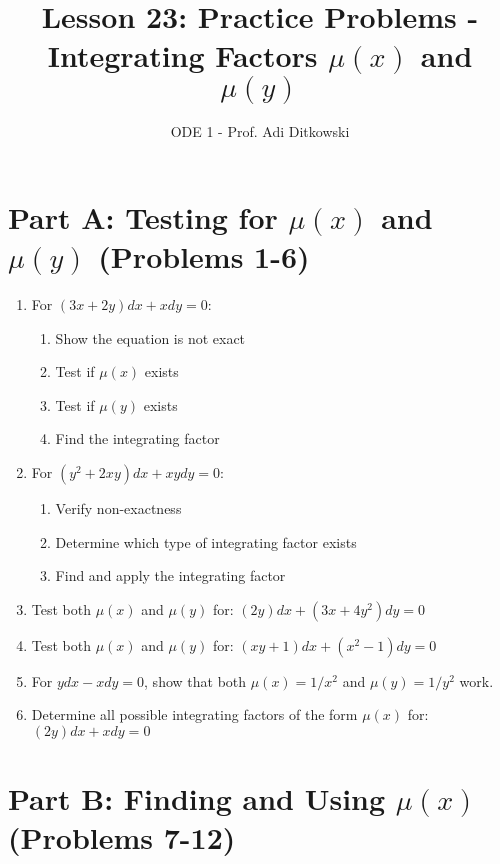 \documentclass[12pt]{article}
\title{Lesson 23: Practice Problems - Integrating Factors $\mu(x)$ and $\mu(y)$}
\author{ODE 1 - Prof. Adi Ditkowski}
\date{}
\begin{document}
\maketitle

\section*{Part A: Testing for $\mu(x)$ and $\mu(y)$ (Problems 1-6)}

\begin{enumerate}
\item For $(3x + 2y)dx + xdy = 0$:
\begin{enumerate}[label=(\alph*)]
    \item Show the equation is not exact
    \item Test if $\mu(x)$ exists
    \item Test if $\mu(y)$ exists
    \item Find the integrating factor
\end{enumerate}

\item For $(y^{2} + 2xy)dx + xydy = 0$:
\begin{enumerate}[label=(\alph*)]
    \item Verify non-exactness
    \item Determine which type of integrating factor exists
    \item Find and apply the integrating factor
\end{enumerate}

\item Test both $\mu(x)$ and $\mu(y)$ for: $(2y)dx + (3x + 4y^{2})dy = 0$

\item Test both $\mu(x)$ and $\mu(y)$ for: $(xy + 1)dx + (x^{2} - 1)dy = 0$

\item For $ydx - xdy = 0$, show that both $\mu(x) = 1/x^{2}$ and $\mu(y) = 1/y^{2}$ work.

\item Determine all possible integrating factors of the form $\mu(x)$ for:
$(2y)dx + xdy = 0$
\end{enumerate}

\section*{Part B: Finding and Using $\mu(x)$ (Problems 7-12)}
\end{document}
